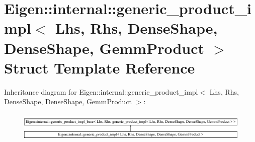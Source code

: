 \hypertarget{struct_eigen_1_1internal_1_1generic__product__impl_3_01_lhs_00_01_rhs_00_01_dense_shape_00_01_def53e16cb724bbb32f6918835a9970bd5}{}\section{Eigen\+::internal\+::generic\+\_\+product\+\_\+impl$<$ Lhs, Rhs, Dense\+Shape, Dense\+Shape, Gemm\+Product $>$ Struct Template Reference}
\label{struct_eigen_1_1internal_1_1generic__product__impl_3_01_lhs_00_01_rhs_00_01_dense_shape_00_01_def53e16cb724bbb32f6918835a9970bd5}
Inheritance diagram for Eigen\+::internal\+::generic\+\_\+product\+\_\+impl$<$ Lhs, Rhs, Dense\+Shape, Dense\+Shape, Gemm\+Product $>$\+:\begin{figure}[H]
\begin{center}
\leavevmode
\includegraphics[height=1.417722cm]{struct_eigen_1_1internal_1_1generic__product__impl_3_01_lhs_00_01_rhs_00_01_dense_shape_00_01_def53e16cb724bbb32f6918835a9970bd5}
\end{center}
\end{figure}
